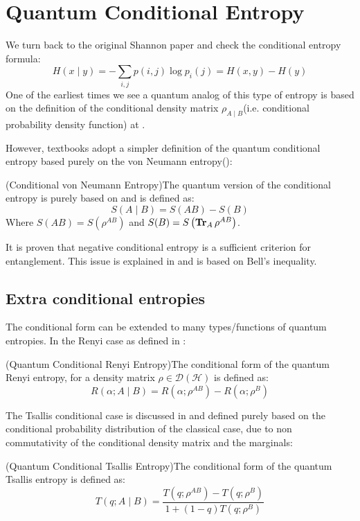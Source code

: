 \section{Quantum Conditional Entropy}
We turn back to the original Shannon paper and check the conditional entropy formula:
\begin{equation}
H(x \mid y)=-\sum_{i, j} p(i, j) \log p_{i}(j)= H(x,y)-H(y)
\end{equation}
\noindent
One of the earliest times we see a quantum analog of this type of entropy is based on the definition of the conditional density matrix $\rho_{A \mid B}$(i.e. conditional probability density function) at \citep{cerf1997negative}.

However, textbooks adopt a simpler definition of the quantum conditional entropy based purely on the von Neumann entropy(\citep{nielsen_chuang_2010}):

\begin{definition}(Conditional von Neumann Entropy)The quantum version of the conditional entropy is purely based on  and is defined as:
\begin{equation}
S(A \mid B) = S(A B)-S(B)
\label{condent}
\end{equation}
\label{defcondin}
Where $S(A B)=S(\rho^{A B})$ and
$S(B)= S\left(\operatorname{\textup{\textbf{Tr}}}_{A} \rho^{A B}\right)$.
\end{definition}
\noindent
It is proven that negative conditional entropy is a sufficient criterion for entanglement. This issue is explained in \citep{cerf1997entropic} and is based on Bell's inequality.
\subsection{Extra conditional entropies} The conditional form can be extended to many types/functions of quantum entropies. In the Renyi case as defined in \citep{vollbrecht2002conditional}:
\begin{definition}(Quantum Conditional Renyi Entropy)The conditional form of the quantum Renyi entropy, for a density matrix $\rho \in \mathcal{D}(\mathcal{H})$ is defined as:
\begin{equation}
R(\alpha;A \mid B)=R(\alpha;\rho^{AB})-R(\alpha;\rho^B)
\end{equation}
\end{definition}
The Tsallis conditional case is discussed in \citep{abe2001nonadditive} and defined purely based on the conditional probability distribution of the classical case, due to non commutativity of the conditional density matrix and the marginals:
\begin{definition}(Quantum Conditional Tsallis Entropy)The conditional form of the quantum Tsallis entropy is defined as:
\begin{equation}
T(q;A \mid B)=\frac{T(q;\rho^{AB})-T(q;\rho^B)}{1+(1-q) T(q;\rho^{B})}
\end{equation}
\label{tsalcond}
\end{definition}